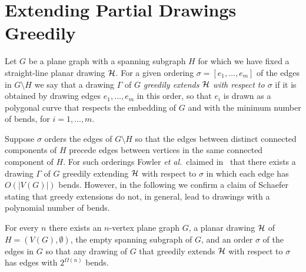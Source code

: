 \documentclass{llncs}
\begin{document}
\section{Extending Partial Drawings Greedily} \label{se:greedy}

Let $G$ be a plane graph with a spanning subgraph $H$ for which we have fixed a straight-line planar drawing ${\cal H}$.
For a given ordering $\sigma=[e_1,\dots,e_m]$ of the edges in $G\setminus H$ we say that a drawing $\Gamma$ of $G$ {\em greedily extends $\cal H$ with respect to $\sigma$} if it is obtained by drawing edges $e_1,\dots,e_m$ in this order, so that $e_i$ is drawn as a polygonal curve that respects the embedding of $G$ and with the minimum number of bends, for $i=1,\dots,m$.

Suppose $\sigma$ orders the edges of $G \setminus H$ so that the edges between distinct connected components of $H$ precede edges between vertices in the same connected component of $H$. For such orderings Fowler {\em et al.}\ claimed in~\cite{fjks-crp-11} that there exists a drawing $\Gamma$ of $G$ greedily extending $\cal H$ with respect to $\sigma$ in which each edge has $O(|V(G)|)$ bends. However, in the following we confirm a claim of Schaefer~\cite{S13a} stating that greedy extensions do not, in general, lead to drawings with a polynomial number of bends.

\begin{theorem}\label{th:greedy}
For every $n$ there exists an $n$-vertex plane graph $G$, a planar drawing $\cal H$ of $H = (V(G), \emptyset)$, the empty spanning subgraph of $G$, and an order $\sigma$ of the edges in $G$ so that any drawing of $G$ that greedily extends $\cal H$ with respect to $\sigma$ has edges with $2^{\Omega(n)}$ bends.
\end{theorem}
\end{document}
